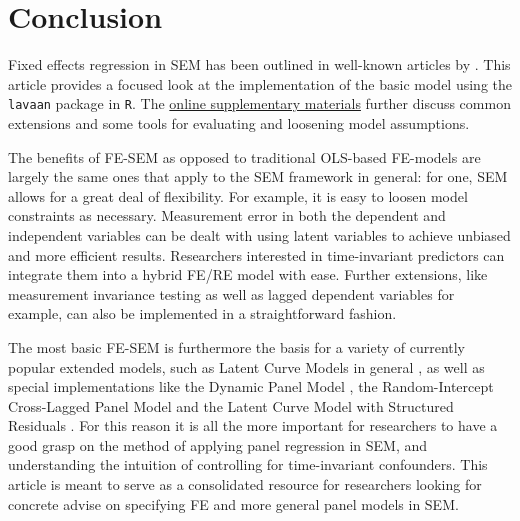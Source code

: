 \documentclass[]{interact}
\theoremstyle{plain}%
\theoremstyle{definition}
\theoremstyle{remark}
\begin{document}
\doublespacing

\hypertarget{conclusion}{%
\section{Conclusion}\label{conclusion}}

Fixed effects regression in SEM has been outlined in well-known articles
by \citep{Allison2011, Bollen2010, Teachman2001}. This article provides
a focused look at the implementation of the basic model using the
\texttt{lavaan} package in \texttt{R}. The
\href{https://github.com/henrik-andersen/FE-SEM/blob/master/extensions.pdf}{online
supplementary materials} further discuss common extensions and some
tools for evaluating and loosening model assumptions.

The benefits of FE-SEM as opposed to traditional OLS-based FE-models are
largely the same ones that apply to the SEM framework in general: for
one, SEM allows for a great deal of flexibility. For example, it is easy
to loosen model constraints as necessary. Measurement error in both the
dependent and independent variables can be dealt with using latent
variables to achieve unbiased and more efficient results. Researchers
interested in time-invariant predictors can integrate them into a hybrid
FE/RE model with ease. Further extensions, like measurement invariance
testing \citep{Schoot2012, Millsap2011, Steenkamp1998} as well as lagged
dependent variables \citep{Bollen2010, Allison2017} for example, can
also be implemented in a straightforward fashion.

The most basic FE-SEM is furthermore the basis for a variety of
currently popular extended models, such as Latent Curve Models in
general \citep{Curran2001, Bollen2004}, as well as special
implementations like the Dynamic Panel Model \citep{Allison2017}, the
Random-Intercept Cross-Lagged Panel Model \citep{Hamaker2015} and the
Latent Curve Model with Structured Residuals \citep{Curran2014}. For
this reason it is all the more important for researchers to have a good
grasp on the method of applying panel regression in SEM, and
understanding the intuition of controlling for time-invariant
confounders. This article is meant to serve as a consolidated resource
for researchers looking for concrete advise on specifying FE and more
general panel models in SEM.



\end{document}
